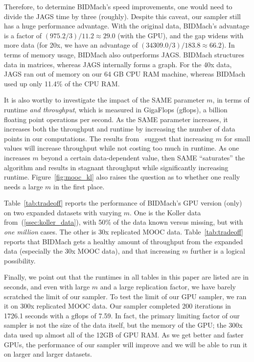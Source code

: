\documentclass{article} %
\begin{document}
Therefore, to determine BIDMach's speed improvements, one would need to divide the JAGS time by
three (roughly). Despite this caveat, our sampler still has a huge performance advantage. With the
original data, BIDMach's advantage is a factor of $(975.2/3)/11.2 \approx 29.0$ (with the GPU), and
the gap widens with more data (for 20x, we have an advantage of $(34309.0/3)/183.8\approx 66.2$).
In terms of memory usage, BIDMach also outperforms JAGS. BIDMach structures data in matrices,
whereas JAGS internally forms a graph.  For the 40x data, JAGS ran out of memory on our 64 GB CPU
RAM machine, whereas BIDMach used up only 11.4\% of the CPU RAM.

It is also worthy to investigate the impact of the SAME parameter $m$, in terms of runtime \emph{and
throughput}, which is measured in GigaFlops (gflops), a billion floating point operations per
second. As the SAME parameter increases, it increases both the throughput and runtime by increasing
the number of data points in our computations. The results from~\citep{SAME2015} suggest that
increasing $m$ for small values will increase throughput while not costing too much in runtime.  As
one increases $m$ beyond a certain data-dependent value, then SAME ``saturates'' the algorithm and
results in stagnant throughput while significantly increasing runtime.  Figure~\ref{fig:mooc_kl}
also raises the question as to whether one really needs a large $m$ in the first place.

Table~\ref{tab:tradeoff} reports the performance of BIDMach's GPU version (only) on two expanded
datasets with varying $m$. One is the Koller data from~(\ref{ssec:koller_data}), with 50\% of the
data known versus missing, but with \emph{one million} cases. The other is 30x replicated MOOC data.
Table~\ref{tab:tradeoff} reports that BIDMach gets a healthy amount of throughput from the expanded
data (especially the 30x MOOC data), and that increasing $m$ further is a logical possibility.

Finally, we point out that the runtimes in all tables in this paper are listed are in seconds, and
even with large $m$ and a large replication factor, we have barely scratched the limit of our
sampler. To test the limit of our GPU sampler, we ran it on 300x replicated MOOC data. Our sampler
completed 200 iterations in 1726.1 seconds with a gflops of 7.59.  In fact, the primary limiting
factor of our sampler is not the size of the data itself, but the memory of the GPU; the 300x data
used up almost all of the 12GB of GPU RAM. As we get better and faster GPUs, the performance of our
sampler will improve and we will be able to run it on larger and larger datasets.
\end{document}
